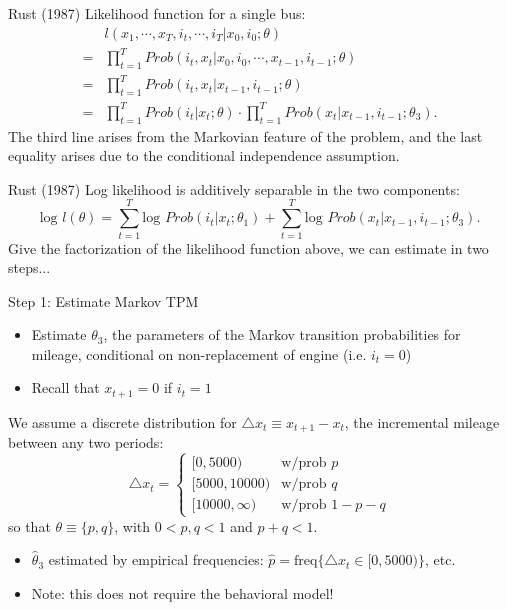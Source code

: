 \documentclass[xcolor=pdftex,dvipsnames,table,mathserif,aspectratio=169]{beamer}
\begin{document}
\begin{frame}{Rust (1987)}
Likelihood function for a single bus:
\begin{equation*}
\begin{split}
& l (x_1, \cdots , x_T, i_t, \cdots , i_T | x_0, i_0 ; \theta) \\
= & \prod^T_{t=1} Prob (i_t, x_t | x_0, i_0, \cdots , x_{t-1}, i_{t-1} ; \theta) \\
= & \prod^T_{t=1} Prob (i_t, x_t |  x_{t-1}, i_{t-1} ; \theta) \\
= & \prod^T_{t=1} Prob (i_t | x_t; \theta) \cdot \prod^T_{t=1} Prob (x_t | x_{t-1}, i_{t-1} ; \theta_3) .
\end{split}
\end{equation*}
The third line arises from the Markovian feature of the problem, and the last equality arises due to the conditional independence assumption. 
\end{frame}

\begin{frame}{Rust (1987)}
Log likelihood is additively separable in the two components:
\begin{equation*}
\text{log } l(\theta) = \sum^T_{t=1} \text{log } Prob (i_t | x_t ; \theta_1) + \sum^T_{t=1} \text{log } Prob (x_t | x_{t-1}, i_{t-1}; \theta_3).
\end{equation*}
Give the factorization of the likelihood function above, we can estimate in two steps... \\
\vspace{3mm}
\end{frame}

\begin{frame}{Step 1: Estimate Markov TPM}
\begin{itemize}
\item Estimate $\theta_3$, the parameters of the Markov transition probabilities for mileage, conditional on non-replacement of engine (i.e. $i_t = 0$)
\item Recall that $x_{t+1} = 0$ if $i_t = 1$
\end{itemize}

We assume a discrete distribution for $\triangle x_t \equiv x_{t+1} - x_t$, the incremental mileage between any two periods:
\begin{equation*}
\triangle x_t = \left \{ 
\begin{matrix}
[0, 5000) & \text{w/prob } p \\
[5000, 10000) & \text{w/prob } q \\
[10000, \infty) & \text{w/prob } 1 - p - q  
\end{matrix}
\right .
\end{equation*}
so that $\theta \equiv \{p, q \}$, with $0 < p, q< 1$ and $p + q < 1$. \\
\vspace{2mm}
\begin{itemize}
\item $\hat \theta_3$ estimated by empirical frequencies: $\hat p = \text{freq} \{ \triangle x_t \in  [0, 5000) \}$, etc. 
\item Note: this does not require the behavioral model!
\end{itemize}
\end{frame}
\end{document}
